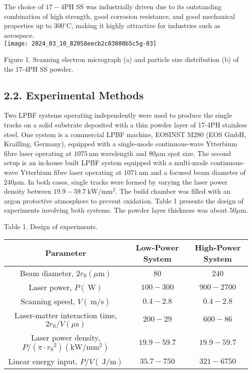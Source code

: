 \documentclass[10pt]{article}
\begin{document}
The choice of $17-4 \mathrm{PH}$ SS was industrially driven due to its outstanding combination of high strength, good corrosion resistance, and good mechanical properties up to $300^{\circ} \mathrm{C}$, making it highly attractive for industries such as aerospace.\\
\texttt{[image: 2024\_03\_10\_82058eecb2c03800b5c5g-03]}

Figure 1. Scanning electron micrograph (a) and particle size distribution (b) of the 17-4PH SS powder.

\subsection*{2.2. Experimental Methods}
Two LPBF systems operating independently were used to produce the single tracks on a solid substrate deposited with a thin powder layer of 17-4PH stainless steel. One system is a commercial LPBF machine, EOSINST M280 (EOS GmbH, Krailling, Germany), equipped with a single-mode continuous-wave Ytterbium fibre laser operating at $1075 \mathrm{~nm}$ wavelength and $80 \mu \mathrm{m}$ spot size. The second setup is an in-house built LPBF system equipped with a multi-mode continuous-wave Ytterbium fibre laser operating at $1071 \mathrm{~nm}$ and a focused beam diameter of $240 \mu \mathrm{m}$. In both cases, single tracks were formed by varying the laser power density between $19.9-59.7 \mathrm{~kW} / \mathrm{mm}^{2}$. The build chamber was filled with an argon protective atmosphere to prevent oxidation. Table 1 presents the design of experiments involving both systems. The powder layer thickness was about $50 \mu \mathrm{m}$.

Table 1. Design of experiments.

\begin{center}
\begin{tabular}{ccc}
\hline
Parameter & Low-Power System & High-Power System \\
\hline
Beam diameter, $2 r_{0}(\mu \mathrm{m})$ & 80 & 240 \\
Laser power, $P(\mathrm{~W})$ & $100-300$ & $900-2700$ \\
Scanning speed, $V(\mathrm{~m} / \mathrm{s})$ & $0.4-2.8$ & $0.4-2.8$ \\
Laser-matter interaction time, $2 r_{0} / V(\mu \mathrm{s})$ & $200-29$ & $600-86$ \\
Laser power density, $P /\left(\pi \cdot r_{0}{ }^{2}\right)\left(\mathrm{kW} / \mathrm{mm}^{2}\right)$ & $19.9-59.7$ & $19.9-59.7$ \\
Linear energy input, $P / V(\mathrm{~J} / \mathrm{m})$ & $35.7-750$ & $321-6750$ \\
\hline
\end{tabular}
\end{center}
\end{document}
